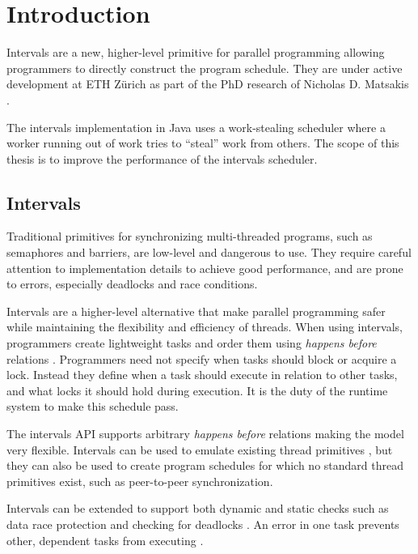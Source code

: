 
\chapter{Introduction}
\label{chap:introduction}

Intervals \cite{Matsakis2009a} are a new, higher-level primitive for
parallel programming allowing programmers to directly construct the
program schedule. They are under active development at ETH Zürich as
part of the PhD research of Nicholas D. Matsakis \cite{Matsakis2010}.

The intervals implementation in Java uses a work-stealing scheduler
where a worker running out of work tries to ``steal'' work from
others. The scope of this thesis is to improve the performance of the
intervals scheduler.


\section{Intervals}
\label{sec:intro-intervals}

Traditional primitives for synchronizing multi-threaded programs, such
as semaphores and barriers, are low-level and dangerous to use. They
require careful attention to implementation details to achieve good
performance, and are prone to errors, especially deadlocks and race
conditions.

Intervals are a higher-level alternative that make parallel
programming safer while maintaining the flexibility and efficiency of
threads. When using intervals, programmers create lightweight tasks
and order them using \emph{happens before} relations
\cite{Lamport1978}. Programmers need not specify when tasks should
block or acquire a lock. Instead they define when a task should
execute in relation to other tasks, and what locks it should hold
during execution. It is the duty of the runtime system to make this
schedule pass.

The intervals API supports arbitrary \emph{happens before} relations
making the model very flexible. Intervals can be used to emulate
existing thread primitives \cite{Matsakis2009a}, but they can also be
used to create program schedules for which no standard thread
primitives exist, such as peer-to-peer synchronization.

Intervals can be extended to support both dynamic and static checks
such as data race protection \cite{Matsakis2010b} and checking for
deadlocks \cite{Matsakis2009}. An error in one task prevents other,
dependent tasks from executing \cite{Matsakis2010a}.

